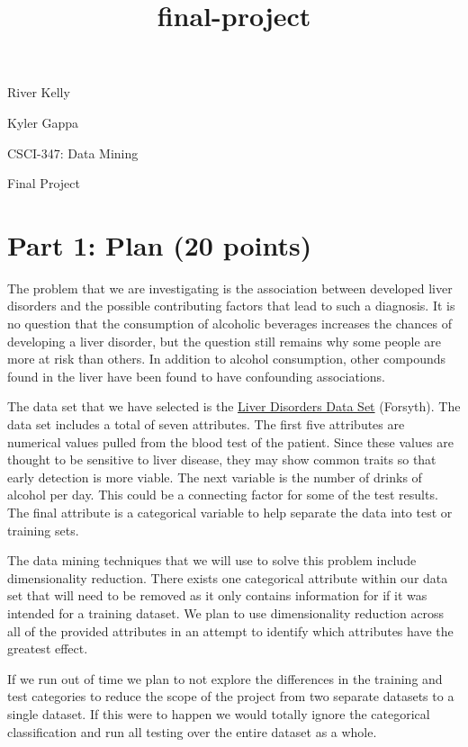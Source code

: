 \documentclass[11pt]{article}
\title{final-project}
\begin{document}
    
    \maketitle
    
    

    
    River Kelly

Kyler Gappa

CSCI-347: Data Mining

Final Project

    \hypertarget{part-1-plan-20-points}{%
\section*{Part 1: Plan (20 points)}\label{part-1-plan-20-points}}

    The problem that we are investigating is the association between
developed liver disorders and the possible contributing factors that
lead to such a diagnosis. It is no question that the consumption of
alcoholic beverages increases the chances of developing a liver
disorder, but the question still remains why some people are more at
risk than others. In addition to alcohol consumption, other compounds
found in the liver have been found to have confounding associations.

The data set that we have selected is the
\href{https://archive.ics.uci.edu/ml/datasets/Liver+Disorders}{Liver
Disorders Data Set} (Forsyth). The data set includes a total of seven
attributes. The first five attributes are numerical values pulled from
the blood test of the patient. Since these values are thought to be
sensitive to liver disease, they may show common traits so that early
detection is more viable. The next variable is the number of drinks of
alcohol per day. This could be a connecting factor for some of the test
results. The final attribute is a categorical variable to help separate
the data into test or training sets.

The data mining techniques that we will use to solve this problem
include dimensionality reduction. There exists one categorical attribute
within our data set that will need to be removed as it only contains
information for if it was intended for a training dataset. We plan to
use dimensionality reduction across all of the provided attributes in an
attempt to identify which attributes have the greatest effect.

If we run out of time we plan to not explore the differences in the
training and test categories to reduce the scope of the project from two
separate datasets to a single dataset. If this were to happen we would
totally ignore the categorical classification and run all testing over
the entire dataset as a whole.
\end{document}
